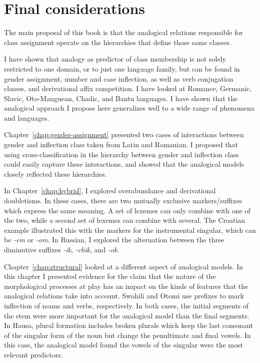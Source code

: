 \section{Final considerations}

The main proposal of this book is that the analogical relations responsible for class assignment operate on the hierarchies that define those same classes.

I have shown that analogy as predictor of  class membership is not solely restricted to one domain, or to just one language family, but can be found in gender assignment, number and case inflection, as well as verb conjugation classes, and derivational affix competition.
I have looked at Romance, Germanic, Slavic, Oto-Manguean, Chadic, and Bantu languages. I have shown that the analogical approach I propose here generalizes well to a wide range of phenomena and languages.

Chapter~\ref{chap:gender-assignment} presented two cases of interactions between gender and inflection class taken from Latin and Romanian.
I proposed that using cross-classification in the hierarchy between gender and inflection class could easily capture these interactions, and showed that the analogical models closely reflected these hierarchies.

In Chapter~\ref{chap:hybrid}, I explored overabundance and derivational doubletisms.
In these cases, there are two mutually exclusive markers/suffixes which express the same meaning. A set of lexemes can only combine with one of the two, while a second set of lexemes can combine with several.
The Croatian example illustrated this with the markers for the instrumental singular, which can be \textit{-em} or \textit{-om}.
In Russian, I explored the alternation between the three diminutive suffixes \textit{-ik}, \textit{-chik}, and \textit{-ok}.

Chapter~\ref{chap:structural} looked at a different aspect of analogical models. In this chapter I presented evidence for the claim that the nature of the morphological processes at play has an impact on the kinds of features that the analogical relations take into account.
Swahili and Otomi use prefixes to mark inflection of nouns and verbs, respectively.
In both cases, the initial segments of the stem were more important for the analogical model than the final segments.
In Hausa, plural formation includes broken plurals which keep the last consonant of the singular form of the noun but change the penultimate and final vowels.
In this case, the analogical model found the vowels of the singular were the most relevant predictors.

